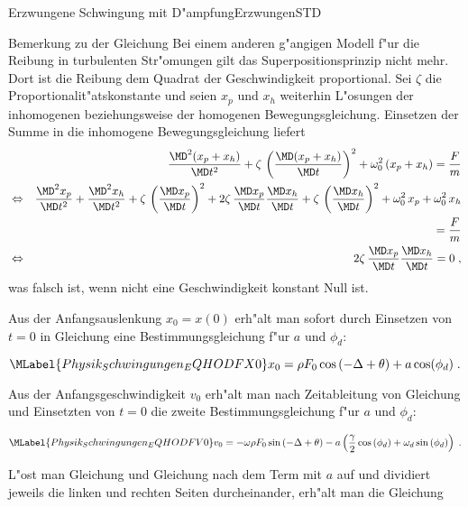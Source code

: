 \begin{MXContent}{Erzwungene Schwingung mit D"ampfung}{Erzwungen}{STD}
    \begin{MHint}{Bemerkung zu der Gleichung}
    Bei einem anderen g"angigen Modell f"ur die Reibung in turbulenten Str"omungen gilt das Superpositionsprinzip nicht mehr. Dort ist die Reibung dem Quadrat der Geschwindigkeit proportional. Sei $\zeta$ die Proportionalit"atskonstante und seien $x_p$ und $x_h$ weiterhin L"osungen der inhomogenen beziehungsweise der homogenen Bewegungsgleichung. Einsetzen der Summe in die inhomogene Bewegungsgleichung liefert
    \begin{eqnarray}%
      && \frac{\MD^2 (x_p + x_h) }{\MD t^2} + \zeta \, \left(\frac{\MD (x_p + x_h) }{\MD t}\right)^2 + \omega_0^2\,(x_p + x_h) = \frac{F}{m}  \\
      & \Leftrightarrow & \frac{\MD^2 x_p }{\MD t^2} + \frac{\MD^2 x_h }{\MD t^2} 
		      + \zeta \, \left(\frac{\MD x_p }{\MD t}\right)^2  + 2\zeta \,\frac{\MD x_p }{\MD t}\frac{\MD x_h }{\MD t} + \zeta \, \left(\frac{\MD x_h }{\MD t}\right)^2 
		      + \omega_0^2\,x_p + \omega_0^2\,x_h\\
      && \quad = \frac{F}{m} \\
      & \Leftrightarrow & 2\zeta \,\frac{\MD x_p }{\MD t}\frac{\MD x_h }{\MD t} = 0\; ,
  \end{eqnarray}
    was falsch ist, wenn nicht eine Geschwindigkeit konstant Null ist.
    \end{MHint}


Aus der Anfangsauslenkung $x_0 = x(0)$ erh"alt man sofort durch Einsetzen von $t=0$ in Gleichung  eine Bestimmungsgleichung f"ur $a$ und $\phi_d$:

\begin{equation}\MLabel{Physik_Schwingungen_EQHODFX0}
  x_0 = \rho F_0 \cos\left(-\Delta + \theta\right) + a\cos(\phi_d) \; .
\end{equation}

Aus der Anfangsgeschwindigkeit $v_0$ erh"alt man nach Zeitableitung von Gleichung  und Einsetzten von $t=0$ die zweite Bestimmungsgleichung f"ur $a$ und $\phi_d$:

\begin{equation}\MLabel{Physik_Schwingungen_EQHODFV0}
  v_0 = - \omega\rho F_0\sin\left(-\Delta+\theta\right) 
    -a\left(\frac{\gamma}{2}\cos\left(\phi_d\right) + \omega_d \sin\left(\phi_d\right)\right)\; .
\end{equation}

L"ost man Gleichung  und Gleichung  nach dem Term mit $a$ auf und dividiert jeweils die linken und rechten Seiten durcheinander, erh"alt man die Gleichung


\end{MXContent}
